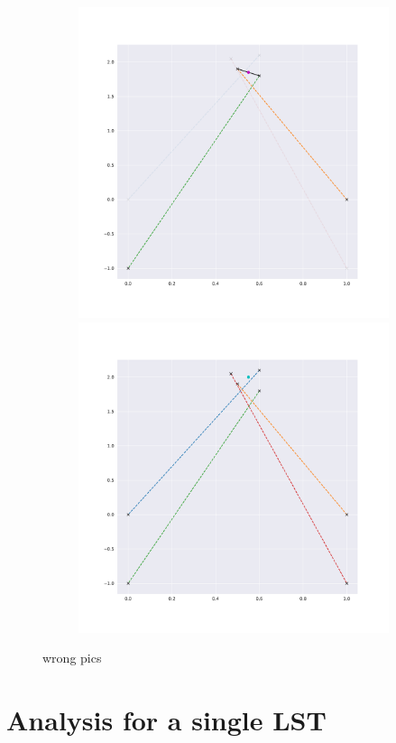 \begin{figure}
\begin{subfigure}{0.23\textwidth}
        \includegraphics[width=0.9\linewidth]{Plots/stereo_magic_4.pdf}
        \includegraphics[width=0.9\linewidth]{Plots/stereo_magic_result.pdf}
    \end{subfigure}   \caption{wrong pics}
    \label{fig:stereo_disp}
\end{figure}


\section{Analysis for a single LST}